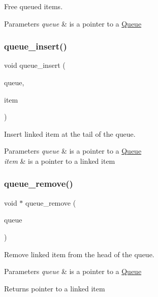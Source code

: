 Free queued items. 


\begin{DoxyParams}{Parameters}
{\em queue} & is a pointer to a \hyperlink{structQueue}{Queue} \\
\hline
\end{DoxyParams}
\mbox{\label{group__queue_gaaa24b65f3154f21e3ff86ef0722b5c33}} 
\subsubsection{\texorpdfstring{queue\+\_\+insert()}{queue\_insert()}}
{\footnotesize\ttfamily void queue\+\_\+insert (\begin{DoxyParamCaption}\item[{\hyperlink{structQueue}{Queue} $\ast$}]{queue,  }\item[{void $\ast$}]{item }\end{DoxyParamCaption})}



Insert linked item at the tail of the queue. 


\begin{DoxyParams}{Parameters}
{\em queue} & is a pointer to a \hyperlink{structQueue}{Queue} \\
\hline
{\em item} & is a pointer to a linked item \\
\hline
\end{DoxyParams}
\mbox{\label{group__queue_ga5f39cda20a9848df6e23aada641f5461}} 
\subsubsection{\texorpdfstring{queue\+\_\+remove()}{queue\_remove()}}
{\footnotesize\ttfamily void $\ast$ queue\+\_\+remove (\begin{DoxyParamCaption}\item[{\hyperlink{structQueue}{Queue} $\ast$}]{queue }\end{DoxyParamCaption})}



Remove linked item from the head of the queue. 


\begin{DoxyParams}{Parameters}
{\em queue} & is a pointer to a \hyperlink{structQueue}{Queue} \\
\hline
\end{DoxyParams}
\begin{DoxyReturn}{Returns}
pointer to a linked item 
\end{DoxyReturn}
